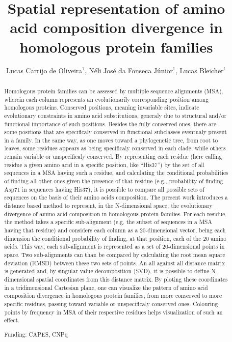 \documentclass[twoside]{article}
\title{\vspace{-15mm}\fontsize{24pt}{10pt}\selectfont\textbf{Spatial representation of amino acid composition divergence in homologous protein families}} %
\author{Lucas Carrijo de Oliveira$^1$, N\'eli Jos\'e da Fonseca J\'unior$^1$, Lucas Bleicher$^1$}
\affil{1 UFMG\\ }
\date{}
\begin{document}
\maketitle %

\thispagestyle{fancy} %


\begin{abstract}
Homologous protein families can be assessed by multiple sequence alignments (MSA), wherein each column represents an evolutionarily corresponding position among homologous proteins. Conserved positions, meaning invariable sites, indicate evolutionary constraints in amino acid substitutions, generaly due to structural and/or functional importance of such positions. Besides the fully conserved ones, there are some positions that are specificaly conserved in functional subclasses eventualy present in a family. In the same way, as one moves toward a phylogenetic tree, from root to leaves, some residues appears as being specificaly conserved in each clade, while others remain variable or unspecificaly conserved. By representing each residue (here calling residue a given amino acid in a specific position, like ``His37'') by the set of all sequences in a MSA having such a residue, and calculating the conditional probabilities of finding all other ones given the presence of that residue (e.g., probability of finding Asp71 in sequences having His37), it is possible to compare all possible sets of sequences on the basis of their amino acids composition. The present work introduces a distance based method to represent, in the N-dimensional space, the evolutionary divergence of amino acid composition in homologous protein families. For each residue, the method takes a specific sub-alignment (e.g, the subset of sequences in a MSA having that residue) and considers each column as a 20-dimensional vector, being each dimension the conditional probability of finding, at that position, each of the 20 amino acids. This way, each sub-alignment is represented as a set of 20-dimensional points in space. Two sub-alignments can than be compared by calculating the root mean square deviation (RMSD) between these two sets of points. An all against all distance matrix is generated and, by singular value decomposition (SVD), it is possible to define N-dimensional spatial coordinates from this distance matrix. By ploting these coordinates in a tridimensional Cartesian plane, one can visualize the pattern of amino acid composition divergence in homologous protein families, from more conserved  to more specific residues, passing toward variable or unspecificaly conserved ones. Colouring points by frequency in MSA of their respective residues helps visualization of such an effect.

Funding: CAPES, CNPq
\end{abstract}
\end{document}
